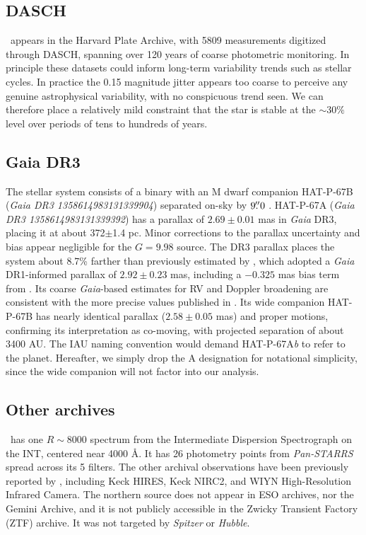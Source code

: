 \documentclass[twocolumn]{aastex631}
\newcommand{\hatp}{\object{HAT-P-67}~}
\begin{document}
\subsection{DASCH}
\hatp appears in the Harvard Plate Archive, with 5809 measurements digitized through DASCH, spanning over 120 years of coarse photometric monitoring.  In principle these datasets could inform long-term variability trends such as stellar cycles.  In practice the 0.15 magnitude jitter appears too coarse to perceive any genuine astrophysical variability, with no conspicuous trend seen.  We can therefore place a relatively mild constraint that the star is stable at the $\sim30\%$ level over periods of tens to hundreds of years.

\subsection{Gaia DR3}\label{gaiadr3}
The stellar system consists of a binary with an M dwarf companion HAT-P-67B (\emph{Gaia DR3 1358614983131339904}) separated on-sky by $9\mbox{$.\!\!^{\prime\prime}$}0$ \citep{2019MNRAS.490.5088M}.  HAT-P-67A (\emph{Gaia DR3 1358614983131339392}) has a parallax of $2.69\pm0.01$ mas in \emph{Gaia} DR3, placing it at about 372$\pm$1.4 pc.  Minor corrections to the parallax uncertainty \citep{2021MNRAS.506.2269E} and bias \citep{2021A&A...649A...4L} appear negligible for the $G=9.98$ source.  The DR3 parallax places the system about 8.7\% farther than previously estimated by \citet{2017AJ....153..211Z}, which adopted a \emph{Gaia} DR1-informed parallax of $2.92\pm0.23$ mas, including a $-0.325$ mas bias term from \citep{2016ApJ...831L...6S}.  Its coarse \emph{Gaia}-based estimates for RV and Doppler broadening are consistent with the more precise values published in \citet{2017AJ....153..211Z}.  Its wide companion HAT-P-67B  \citep{2019MNRAS.490.5088M} has nearly identical parallax ($2.58\pm0.05$ mas) and proper motions, confirming its interpretation as co-moving, with projected separation of about 3400 AU.  The IAU naming convention would demand HAT-P-67A\emph{b} to refer to the planet.  Hereafter, we simply drop the A designation for notational simplicity, since the wide companion will not factor into our analysis.

\subsection{Other archives}
\hatp has one $R\sim8000$ spectrum from the Intermediate Dispersion Spectrograph on the INT, centered near 4000 \AA.  It has 26 photometry points from \emph{Pan-STARRS} spread across its 5 filters.  The other archival observations have been previously reported by \citet{2017AJ....153..211Z}, including Keck HIRES, Keck NIRC2, and WIYN High-Resolution Infrared Camera.  The northern source does not appear in ESO archives, nor the Gemini Archive, and it is not publicly accessible in the Zwicky Transient Factory (ZTF) archive.  It was not targeted by \emph{Spitzer} or \emph{Hubble}.
\end{document}
